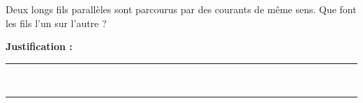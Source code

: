 Deux longs fils parallèles sont parcourus par des courants de même sens. Que font les fils l'un sur l'autre ?

\choices

\noindent\textbf{Justification :} \hrulefill \\[2.5ex]
\rule{\linewidth}{0.4pt} \\[2.5ex]
\rule{\linewidth}{0.4pt}
\vfill
